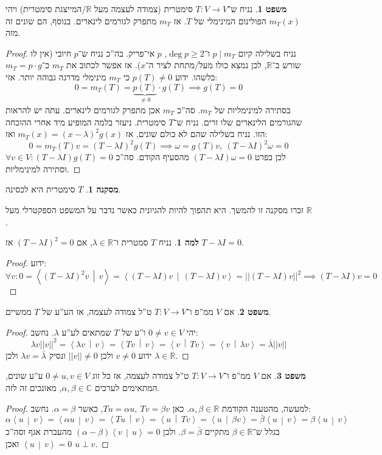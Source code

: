 \documentclass[a4paper]{article}
\newcommand\R     {\mathbb{R}}
\newcommand\C     {\mathbb{C}}
\newcommand\ra    {\rangle}
\newcommand\la    {\langle}
\newcommand\ol    {\overline}
\newcommand\co        {\colon}
\newcommand\norm[1]   {\left \vert \left \vert #1 \right \vert \right \vert}
\newcommand\mut [2]   {\left \la #1 \,\middle|\, #2 \right \ra}
\newcommand\ag        {\alpha}
\newcommand\bg        {\beta}
\renewcommand\lg      {\lambda}
\theoremstyle{definition}
\newtheorem{Theorem}{\color{myblue}משפט}
\newtheorem{Lemma}{\color{myyellow}למה}
\newtheorem{Collary}{\color{mymagenta}מסקנה}
\newcommand\cola [1] {\begin{Collary}#1\end{Collary}}
\newcommand\theo  [1] {\begin{Theorem}#1\end{Theorem}}
\newcommand\lem   [1] {\begin{Lemma}#1\end{Lemma}}
\begin{document}
	\theo{נניח ש־$T \co V \to V$ סימטרית (צמודה לעצמה מעל $\R$/המייצגת סימטרית) ויהי $m_T(x)$ הפולינום המינימלי של $T$. אז $m_T$ מתפרק לגורמים לינארים. בנוסף, הם שונים זה מזה. }
	\begin{proof}
		נניח בשלילה קיום $p \mid m_T$ ו־$\deg p \ge 2$, $p $ אי־פריק. בה''כ נניח ש־$p$ חיובי (אין לו שורש ב־$\R$, לכן נמצא כולו מעל/מתחת לציר ה־$x$). אז אפשר לכתוב את $m_T$ כ־$m_T = p \cdot g$ כלשהו. ידוע $p(T) \neq 0$ כי $m_T$ מינימלי מדרגה גבוהה יותר. 
		אזי: 
		\[ 0 = m_T(T) = \underbrace{p(T)}_{\neq 0} \cdot g(T) \implies g(T) = 0 \]
		בסתירה למינימליות של $m_T$. סה''כ $m_T$ אכן מתפרק לגורמים לינארים. עתה יש להראות שהגורמים הלינארים שלו זרים. נניח ש־$T$ סימטרית. ניעזר בלמה המופיע מיד אחרי ההוכחה הזו. נניח בשלילה שהם לא כולם שונים, אז $m_T(x) = (x - \lg)^2g(x)$ ואז: 
		\[ 0 = m_T(T)v = (T - \lg I)^{2}g(T) \implies \omega = g(T)v, \ (T - \lg I)^2\omega = 0 \]
		לכן בפרט $(T - \lg I)\omega = 0$ מהסעיף הקודם. סה''כ $\forall v \in V \co (T - \lg I)g(T) = 0$ וסתירה למינימליות. 
	\end{proof}
	
	\cola{$T$ סימטרית היא לכסינה. }
	זכרו מסקנה זו להמשך. היא תהפוך להיות להגיונית כאשר נדבר על המשפט הספקטרלי מעל $\R$. 
	
	\lem{נניח $T$ סמטרית ו־$\lg \in \R$, אם $(T - \lg I)^{2} = 0$ אז $T - \lg I = 0$. }\begin{proof}
		ידוע: 
		\[ \forall v \co 0 = \mut{(T - \lg I)^{2}v}{v} = \mut{(T - \lg I)v}{(T - \lg I)v} = \norm{(T - \lg I)v}^2 \implies (T - \lg I)v = 0 \]
	\end{proof}
	
	\theo{אם $V$ ממ''פ ו־$T \co V \to V$ ט''ל צמודה לעצמה, אז הע''ע של $T$ ממשיים. }\begin{proof}
		יהי $0 \neq v \in V$ ו''ע של $T$ שמתאים לע''ע $\lg$. נחשב: 
		\[ \lg v\norm{v}^2 = \mut{\lg v}{v} = \mut{T v}{v} = \mut{v}{Tv} = \mut{v}{\lg v} = \ol \lg \norm{v} \]
		ידוע $v \neq 0$ ולכן $\norm{v} \neq 0$ ונסיק $\lg v = \bar \lg $ ולכן $\lg \in \R$. 
	\end{proof}
	
	\theo{אם $V$ ממ''פ ו־$T \co V \to V$ ט''ל צמודה לעצמה, אז כל זוג $0 \neq u, v \in V$ ע''ע שונים, המתאימים לערכים $\ag, \bg \in \C$, מאונכים זה לזה. }\begin{proof}
		למעשה, מהטענה הקודמת $\ag, \bg \in \R$. כאן $Tu = \ag u, \ Tv = \bg v$, כאשר $\ag = \bg$. נחשב: 
		\[ \ag \mut{u}{v} = \mut{\ag u}{v} = \mut{Tu}{v} = \mut{u}{Tv} = \mut{u}{\bg v} = \bar \bg \mut{u}{v} = \bg \mut{u}{v} \]
		בגלל ש־$\bg \in \R$ מתקיים $\bg = \bar \bg$. ולכן $(\ag - \bg)\mut{v}{u} = 0$ מהעברת אגף וסה''כ $\mut{u}{v} = 0$ ואכן $u \perp v$. 
	\end{proof}
	
\end{document}
